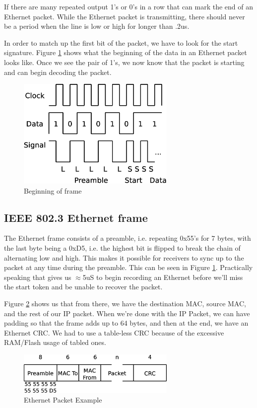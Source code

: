 \documentclass[13pt]{ltxdoc}
\begin{document}
If there are many repeated output 1's or 0's in a row that can mark the end of an Ethernet packet.
While the Ethernet packet is transmitting, there should never be a period when the line is low
or high for longer than .2us.

In order to match up the first bit of the packet, we have to look for the start signature.
Figure \ref{manchesterb} shows what the beginning of the data in an Ethernet packet looks like.
Once we see the pair of 1's, we now know that the packet is starting and can begin 
decoding the packet.

\begin{figure}
    \centering
    \includegraphics[width=3.0in]{manchesterb}
    \caption{Beginning of frame}
    \label{manchesterb}
\end{figure}


\subsection{IEEE 802.3 Ethernet frame}
The Ethernet frame consists of a preamble, i.e. repeating 0x55's for 7 bytes, with the last
byte being a 0xD5, i.e. the highest bit is flipped to break the chain of alternating low
and high.  This makes it possible for receivers to sync up to the packet at any time during the
preamble.  This can be seen in Figure \ref{manchesterb}.  Practically speaking that gives us $\approx$5uS to begin recording an Ethernet 
before we'll miss the start token and be unable to recover the packet.

Figure \ref{etherfarme} shows us that from there, we have the destination MAC, source MAC, and the rest of our IP packet.
When we're done with the IP Packet, we can have padding so that the frame adds up to 64 bytes, and then at the end, we have an Ethernet CRC.
We had to use a table-less CRC because of the excessive RAM/Flash usage of tabled ones.

\begin{figure}
    \centering
    \includegraphics[width=3.0in]{etherframe}
    \caption{Ethernet Packet Example}
    \label{etherfarme}
\end{figure}
\end{document}

